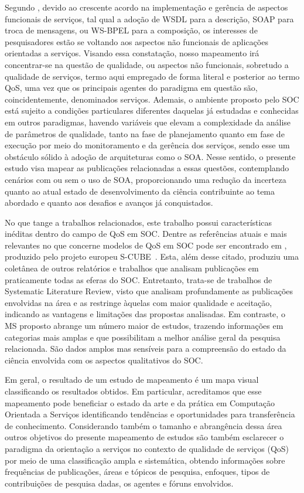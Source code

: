Segundo \cite{Papazoglou:2007:SOA:1265289.1265298}, devido ao crescente acordo na implementação e gerência de aspectos funcionais de serviços, tal qual a adoção de WSDL para a descrição, SOAP para troca de mensagens, ou WS-BPEL para a composição, os interesses de pesquisadores estão se voltando aos aspectos não funcionais de aplicações orientadas a serviços. Visando essa constatação, nosso mapeamento irá concentrar-se na questão de qualidade, ou aspectos não funcionais, sobretudo a qualidade de serviços, termo aqui empregado de forma literal e posterior ao termo QoS, uma vez que os principais agentes do paradigma em questão são, coincidentemente, denominados serviços. Ademais, o ambiente proposto pelo SOC está sujeito a condições particulares diferentes daquelas já estudadas e conhecidas em outros paradigmas, havendo variáveis que elevam a complexidade da análise de parâmetros de qualidade, tanto na fase de planejamento quanto em fase de execução por meio do monitoramento e da gerência dos serviços, sendo esse um obstáculo sólido à adoção de arquiteturas como o SOA. Nesse sentido, o presente estudo visa mapear as publicações relacionadas a essas questões, contemplando cenários com ou sem o uso de SOA, proporcionando uma redução da incerteza quanto ao atual estado de desenvolvimento da ciência contribuinte ao tema abordado e quanto aos desafios e avanços já conquistados.

No que tange a trabalhos relacionados, este trabalho possui características inéditas dentro do campo de QoS em SOC. Dentre as referências atuais e mais relevantes no que concerne modelos de QoS em SOC pode ser encontrado em \cite{pernici}, produzido pelo projeto europeu S-CUBE~\cite{scube}. Esta, além desse citado, produziu uma coletânea de outros relatórios e trabalhos que analisam publicações em praticamente todas as eferas do SOC. Entretanto, trata-se de trabalhos de Systematic Literature Review, visto que analisam profundamente as publicações envolvidas na área e as restringe àquelas com maior qualidade e aceitação, indicando as vantagens e limitações das propostas analisadas. Em contraste, o MS proposto abrange um número maior de estudos, trazendo informações em categorias mais amplas e que possibilitam a melhor análise geral da pesquisa relacionada. São dados amplos mas sensíveis para a compreensão do estado da ciência envolvida com os aspectos qualitativos do SOC.

Em geral, o resultado de um estudo de mapeamento é um mapa visual classificando os resultados obtidos. Em particular, acreditamos que esse mapeamento pode beneficiar o estado da arte e da pr\'{a}tica em Computa\c{c}\~{a}o Orientada a Servi\c{c}os identificando tend\^{e}ncias e oportunidades para transfer\^{e}ncia de conhecimento. Considerando tamb\'{e}m o tamanho e abrang\^{e}ncia dessa \'{a}rea outros  objetivos do presente mapeamento de estudos s\~{a}o tamb\'{e}m esclarecer o paradigma da orientação a serviços no contexto de qualidade de servi\c{c}os (QoS) por meio de uma classificação ampla e sistemática, obtendo informações sobre frequências de publica\c{c}\~{o}es, \'{a}reas e t\'{o}picos de pesquisa, enfoques, tipos de contribui\c{c}\~{o}es de pesquisa dadas, os agentes e f\'{o}runs envolvidos.

